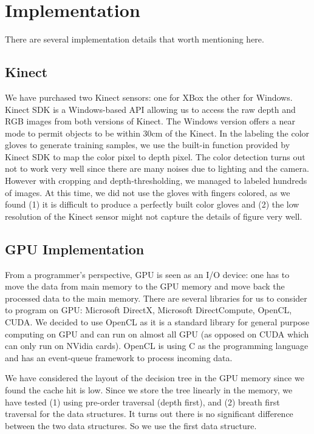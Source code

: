 \section{Implementation}

There are several implementation details that worth mentioning here. 

\subsection{Kinect}
We have purchased two Kinect sensors: one for XBox the other for Windows. Kinect SDK is a Windows-based API allowing us to access the raw depth and RGB images from both versions of Kinect. The Windows version offers a near mode to permit objects to be within 30cm of the Kinect. In the labeling the color gloves to generate training samples, we use the built-in function provided by Kinect SDK to map the color pixel to depth pixel. The color detection turns out not to work very well since there are many noises due to lighting and the camera. However with cropping and depth-thresholding, we managed to labeled hundreds of images. At this time, we did not use the gloves with fingers colored, as we found (1) it is difficult to produce a perfectly built color gloves and (2) the low resolution of the Kinect sensor might not capture the details of figure very well.

\subsection{GPU Implementation}
From a programmer's perspective, GPU is seen as an I/O device: one has to move the data from main memory to the GPU memory and move back the processed data to the main memory. There are several libraries for us to consider to program on GPU: Microsoft DirectX, Microsoft DirectCompute, OpenCL, CUDA. We decided to use OpenCL as it is a standard library for general purpose computing on GPU and can run on almost all GPU (as opposed on CUDA which can only run on NVidia cards). OpenCL is using C as the programming language and has an event-queue framework to process incoming data. 

We have considered the layout of the decision tree in the GPU memory since we found the cache hit is low. Since we store the tree linearly in the memory, we have tested (1) using pre-order traversal (depth first), and (2) breath first traversal for the data structures. It turns out there is no significant difference between the two data structures. So we use the first data structure.  

